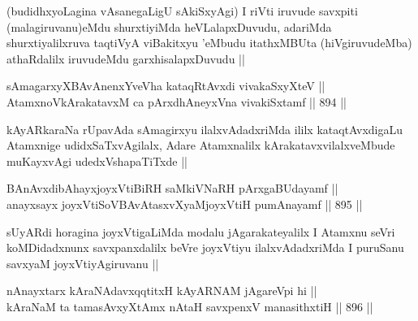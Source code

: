 \begin{artha}
(budidhxyoLagina vAsanegaLigU sAkiSxyAgi) I riVti iruvude savxpiti (malagiruvanu)eMdu shurxtiyiMda heVLalapxDuvudu, adariMda shurxtiyalilxruva taqtiVyA viBakitxyu \stext'eMbudu itathxMBUta (hiVgiruvudeMba) athaRdalilx iruvudeMdu garxhisalapxDuvudu ||
\end{artha}


\begin{shl}
sAmagarxyXBAvAnenxYveVha kataqRtAvxdi vivakaSxyXteV || \\
AtamxnoV\s kArakatavxM ca pArxdhAneyxVna vivakiSxtamf ||  894 ||  
\end{shl}

\begin{artha}
kAyARkaraNa rUpavAda sAmagirxyu ilalxvAdadxriMda ililx kataqtAvxdigaLu Atamxnige udidxSaTxvAgilalx, Adare Atamxnalilx kArakatavxvilalxveMbude muKayxvAgi udedxVshapaTiTxde ||
\end{artha}


\begin{shl}
BAnAvxdibAhayxjoyxVtiBiRH saMkiVNaRH pArxgaBUdayamf || \\
anayxsayx joyxVtiSoV\s BAvAtasxvXyaMjoyxVtiH pumAnayamf ||  895 ||  
\end{shl}

\begin{artha}
sUyARdi horagina joyxVtigaLiMda modalu jAgarakateyalilx I Atamxnu seVri koMDidadxnunx savxpanxdalilx beVre joyxVtiyu ilalxvAdadxriMda I puruSanu savxyaM joyxVtiyAgiruvanu || 
\end{artha}


\begin{shl}
nAnayxtarx kAraNAdavxqqtitxH kAyARNAM jAgareV\s pi hi || \\
kAraNaM ta tamasAvxyXtAmx nAtaH savxpenxV manasithxtiH ||  896 ||  
\end{shl}

